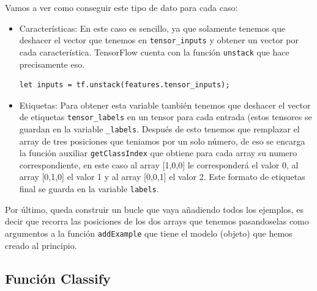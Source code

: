\documentclass[a4paper, 12pt]{book}
\begin{document}
Vamos a ver como conseguir este tipo de dato para cada caso:

\begin{itemize}
	\item Características: En este caso es sencillo, ya que solamente tenemos que deshacer el vector que tenemos en \texttt{tensor\_inputs} y obtener un vector por cada característica. TensorFlow cuenta con la función \texttt{unstack} que hace precisamente eso.
\begin{verbatim}
let inputs = tf.unstack(features.tensor_inputs);
\end{verbatim}	
	\item Etiquetas: Para obtener esta variable también tenemos que deshacer el vector de etiquetas \texttt{tensor\_labels} en un tensor para cada entrada (estos tensores se guardan en la variable \texttt{\_labels}. Después de esto tenemos que remplazar el array de tres posiciones que teniamos por un solo número, de eso se encarga la función auxiliar  \texttt{getClassIndex} que obtiene para cada array su numero correspondiente, en este caso al array [1,0,0] le corresponderá el valor 0, al array [0,1,0] el valor 1 y al array [0,0,1] el valor 2. Este formato de etiquetas final se guarda en la variable \texttt{labels}.
\end{itemize}

Por último, queda construir un bucle que vaya añadiendo todos los ejemplos, es decir que recorra las posiciones de los dos arrays que tenemos pasandoselas como argumentos a la función \texttt{addExample} que tiene el modelo (objeto) que hemos creado al principio.

\subsection{Función Classify} 
\label{sec:funcionclassifyknn}
\end{document}
